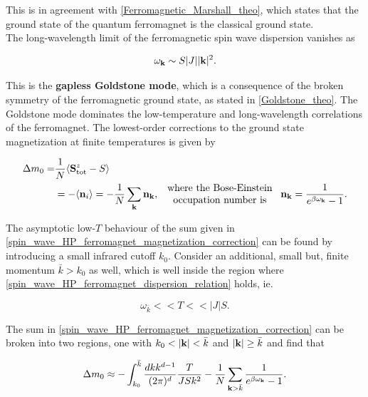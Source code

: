 \documentclass{homework}
\begin{document}
This is in agreement with \cref{Ferromagnetic_Marshall_theo}, which states that the ground state of the quantum ferromagnet is the classical ground state. \\

The long-wavelength limit of the ferromagnetic spin wave dispersion vanishes as 

\begin{equation}
    \omega_{{\bf k}} \sim S |J| |{\bf k}|^2. 
    \label{spin_wave_HP_ferromagnet_dispersion_relation}
\end{equation}
   
This is the \textbf{gapless Goldstone mode}, which is a 
consequence of the broken symmetry of the ferromagnetic 
ground state, as stated in \cref{Goldstone_theo}. The 
Goldstone mode dominates the low-temperature and 
long-wavelength correlations of the ferromagnet. The 
lowest-order corrections to the ground state magnetization at finite temperatures is given by 

\begin{equation}
    \begin{split}
        \Delta m_0 =& \frac{1}{N} \langle {\bf S}^z_{\textnormal{tot}} - S \rangle \\
        &= - \langle {\bf n}_i \rangle = -\frac{1}{N} \sum_{{\bf k}} {\bf n}_{{\bf k}}, \begin{array}{cc}
             \textnormal{ where the Bose-Einstein }  \\
             \textnormal{ occupation number is }
        \end{array} {\bf n}_{{\bf k}} = \frac{1}{e^{\beta \omega_{{\bf k}}} - 1}. 
    \end{split}
    \label{spin_wave_HP_ferromagnet_magnetization_correction}
\end{equation}

The asymptotic low-$T$ behaviour of the sum given in  \cref{spin_wave_HP_ferromagnet_magnetization_correction} can be found by introducing a small infrared cutoff $k_0$. Consider an additional, small but, finite momentum $\bar{k} > k_0$ as well, which is well inside the region where \cref{spin_wave_HP_ferromagnet_dispersion_relation} holds, ie. 

$$
    \omega_{\bar{k}} << T << |J| S.
$$

The sum in \cref{spin_wave_HP_ferromagnet_magnetization_correction} can be broken into two regions, one with $k_0 < |{\bf k}| < \bar{k}$ and $|{\bf k}| \geq {\bar{k}}$ and find that 

\begin{equation}
    \Delta m_0 \approx - \int_{k_0}^{\bar{k}} \frac{dk k^{d-1}}{(2\pi)^d} \frac{T}{J S k^2} - \frac{1}{N} \sum_{{\bf k} > \bar{k}} \frac{1}{e^{\beta \omega_{{\bf k}}} - 1}.
\end{equation}
\end{document}
